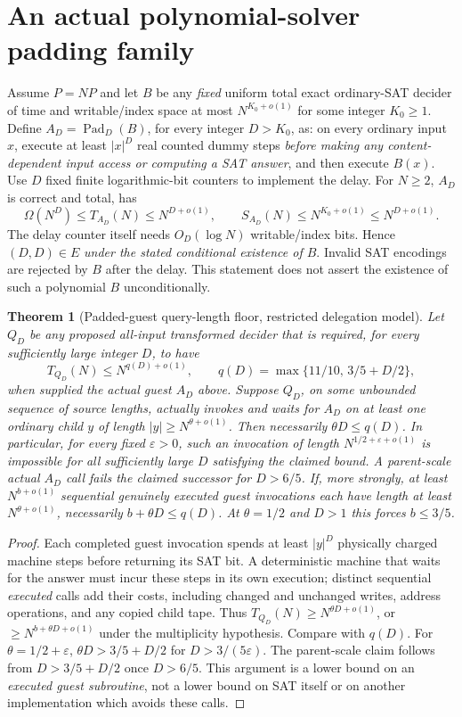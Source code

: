 \documentclass[11pt]{article}
\newtheorem{theorem}{Theorem}
\begin{document}
\section*{An actual polynomial-solver padding family}
Assume \(P=NP\) and let \(B\) be any \emph{fixed} uniform total exact ordinary-SAT decider of time and writable/index space at most \(N^{K_0+o(1)}\) for some integer \(K_0\ge1\). Define \(A_D=\operatorname{Pad}_D(B)\), for every integer \(D>K_0\), as: on every ordinary input \(x\), execute at least \(|x|^D\) real counted dummy steps \emph{before making any content-dependent input access or computing a SAT answer}, and then execute \(B(x)\). Use \(D\) fixed finite logarithmic-bit counters to implement the delay. For \(N\ge2\), \(A_D\) is correct and total, has
\[
  \Omega(N^D)\le T_{A_D}(N)\le N^{D+o(1)},\qquad
  S_{A_D}(N)\le N^{K_0+o(1)}\le N^{D+o(1)}.
\]
The delay counter itself needs \(O_D(\log N)\) writable/index bits. Hence \((D,D)\in E\) \emph{under the stated conditional existence of \(B\)}. Invalid SAT encodings are rejected by \(B\) after the delay. This statement does not assert the existence of such a polynomial \(B\) unconditionally.

\begin{theorem}[Padded-guest query-length floor, restricted delegation model]
Let \(Q_D\) be any proposed all-input transformed decider that is required, for every sufficiently large integer \(D\), to have
\[
 T_{Q_D}(N)\le N^{q(D)+o(1)},\qquad
 q(D)=\max\{11/10,\,3/5+D/2\},
\]
when supplied the \emph{actual} guest \(A_D\) above. Suppose \(Q_D\), on some unbounded sequence of source lengths, \emph{actually invokes and waits for} \(A_D\) on at least one ordinary child \(y\) of length \(|y|\ge N^{\theta+o(1)}\). Then necessarily \(\theta D\le q(D)\). In particular, for every fixed \(\varepsilon>0\), such an invocation of length \(N^{1/2+\varepsilon+o(1)}\) is impossible for all sufficiently large \(D\) satisfying the claimed bound. A parent-scale actual \(A_D\) call fails the claimed successor for \(D>6/5\).
If, more strongly, at least \(N^{b+o(1)}\) \emph{sequential genuinely executed} guest invocations each have length at least \(N^{\theta+o(1)}\), necessarily \(b+\theta D\le q(D)\). At \(\theta=1/2\) and \(D>1\) this forces \(b\le3/5\).
\end{theorem}
\begin{proof}
Each completed guest invocation spends at least \(|y|^D\) physically charged machine steps before returning its SAT bit. A deterministic machine that waits for the answer must incur these steps in its own execution; distinct sequential \emph{executed} calls add their costs, including changed and unchanged writes, address operations, and any copied child tape. Thus
\(T_{Q_D}(N)\ge N^{\theta D+o(1)}\), or \(\ge N^{b+\theta D+o(1)}\) under the multiplicity hypothesis. Compare with \(q(D)\). For \(\theta=1/2+\varepsilon\), \(\theta D>3/5+D/2\) for \(D>3/(5\varepsilon)\). The parent-scale claim follows from \(D>3/5+D/2\) once \(D>6/5\). This argument is a lower bound on an \emph{executed guest subroutine}, not a lower bound on SAT itself or on another implementation which avoids these calls.
\end{proof}
\end{document}
